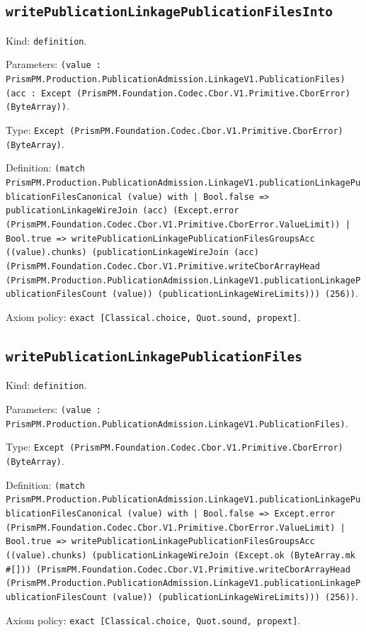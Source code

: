 \documentclass[11pt]{article}
\begin{document}
\subsection*{\texttt{writePublicationLinkagePublicationFilesInto}}
\noindent Kind: \texttt{definition}.\par
\noindent Parameters: \texttt{(value : PrismPM.Production.PublicationAdmission.LinkageV1.PublicationFiles) (acc : Except (PrismPM.Foundation.Codec.Cbor.V1.Primitive.CborError) (ByteArray))}.\par
\noindent Type: \texttt{Except (PrismPM.Foundation.Codec.Cbor.V1.Primitive.CborError) (ByteArray)}.\par
\noindent Definition: \texttt{(match PrismPM.Production.PublicationAdmission.LinkageV1.publicationLinkagePublicationFilesCanonical (value) with | Bool.false => publicationLinkageWireJoin (acc) (Except.error (PrismPM.Foundation.Codec.Cbor.V1.Primitive.CborError.ValueLimit)) | Bool.true => writePublicationLinkagePublicationFilesGroupsAcc ((value).chunks) (publicationLinkageWireJoin (acc) (PrismPM.Foundation.Codec.Cbor.V1.Primitive.writeCborArrayHead (PrismPM.Production.PublicationAdmission.LinkageV1.publicationLinkagePublicationFilesCount (value)) (publicationLinkageWireLimits))) (256))}.\par
\noindent Axiom policy: \texttt{exact [Classical.choice, Quot.sound, propext]}.\par
\subsection*{\texttt{writePublicationLinkagePublicationFiles}}
\noindent Kind: \texttt{definition}.\par
\noindent Parameters: \texttt{(value : PrismPM.Production.PublicationAdmission.LinkageV1.PublicationFiles)}.\par
\noindent Type: \texttt{Except (PrismPM.Foundation.Codec.Cbor.V1.Primitive.CborError) (ByteArray)}.\par
\noindent Definition: \texttt{(match PrismPM.Production.PublicationAdmission.LinkageV1.publicationLinkagePublicationFilesCanonical (value) with | Bool.false => Except.error (PrismPM.Foundation.Codec.Cbor.V1.Primitive.CborError.ValueLimit) | Bool.true => writePublicationLinkagePublicationFilesGroupsAcc ((value).chunks) (publicationLinkageWireJoin (Except.ok (ByteArray.mk \#[])) (PrismPM.Foundation.Codec.Cbor.V1.Primitive.writeCborArrayHead (PrismPM.Production.PublicationAdmission.LinkageV1.publicationLinkagePublicationFilesCount (value)) (publicationLinkageWireLimits))) (256))}.\par
\noindent Axiom policy: \texttt{exact [Classical.choice, Quot.sound, propext]}.\par
\end{document}
